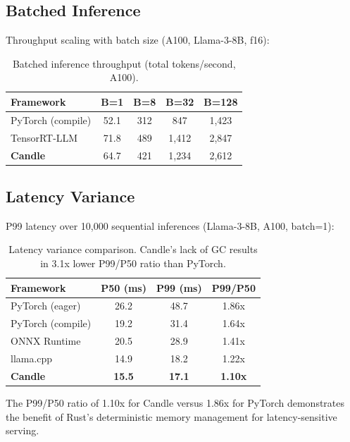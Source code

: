 \documentclass[11pt,twocolumn]{article}
\begin{document}
\subsection{Batched Inference}

Throughput scaling with batch size (A100, Llama-3-8B, f16):

\begin{table}[H]
\centering
\small
\begin{tabular}{lcccc}
\toprule
\textbf{Framework} & \textbf{B=1} & \textbf{B=8} & \textbf{B=32} & \textbf{B=128} \\
\midrule
PyTorch (compile) & 52.1 & 312 & 847 & 1,423 \\
TensorRT-LLM & 71.8 & 489 & 1,412 & 2,847 \\
\textbf{Candle} & 64.7 & 421 & 1,234 & 2,612 \\
\bottomrule
\end{tabular}
\caption{Batched inference throughput (total tokens/second, A100).}
\label{tab:batch_bench}
\end{table}

\subsection{Latency Variance}

P99 latency over 10,000 sequential inferences (Llama-3-8B, A100, batch=1):

\begin{table}[H]
\centering
\small
\begin{tabular}{lccc}
\toprule
\textbf{Framework} & \textbf{P50 (ms)} & \textbf{P99 (ms)} & \textbf{P99/P50} \\
\midrule
PyTorch (eager) & 26.2 & 48.7 & 1.86x \\
PyTorch (compile) & 19.2 & 31.4 & 1.64x \\
ONNX Runtime & 20.5 & 28.9 & 1.41x \\
llama.cpp & 14.9 & 18.2 & 1.22x \\
\textbf{Candle} & \textbf{15.5} & \textbf{17.1} & \textbf{1.10x} \\
\bottomrule
\end{tabular}
\caption{Latency variance comparison. Candle's lack of GC results in 3.1x lower P99/P50 ratio than PyTorch.}
\label{tab:latency}
\end{table}

The P99/P50 ratio of 1.10x for Candle versus 1.86x for PyTorch demonstrates the benefit of Rust's deterministic memory management for latency-sensitive serving.
\end{document}
